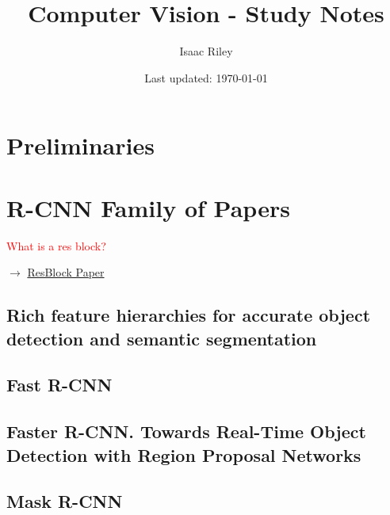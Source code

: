 \documentclass[a4paper]{article}
\title{Computer Vision - Study Notes}
\author{Isaac Riley}
\date{Last updated: \today}
\newcommand{\followup}[1]{\textcolor{red}{ #1 }}
\begin{document}
\maketitle
\tableofcontents
\newpage


\setcounter{section}{-1}
\section{Preliminaries}


\section{R-CNN Family of Papers}
\followup{What is a res block?}

$\rightarrow$ \href{https://paperswithcode.com/paper/deep-residual-learning-for-image-recognition}{ResBlock Paper}

\subsection{Rich feature hierarchies for accurate object detection and semantic segmentation}

\subsection{Fast R-CNN}

\subsection{Faster R-CNN. Towards Real-Time Object Detection with Region Proposal Networks}

\subsection{Mask R-CNN}


%
%
%

\newpage
\section{}

%
%
%

\newpage
\section{}
\end{document}
